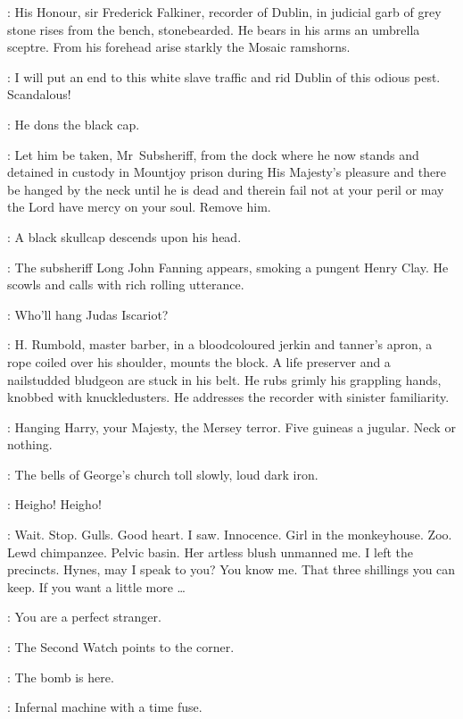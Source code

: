 :
His Honour,
sir Frederick Falkiner,
recorder of Dublin,
in judicial garb of grey stone rises from the bench,
stonebearded.
He bears in his arms an umbrella sceptre.
From his forehead arise starkly the Mosaic ramshorns.

\Recorder:
I will put an end to this white slave traffic
and rid Dublin of this odious pest.
Scandalous!

:
He dons the black cap.

\Recorder:
Let him be taken,
Mr~Subsheriff,
from the dock where he now stands
and detained in custody in Mountjoy prison during His Majesty's pleasure
and there be hanged by the neck until he is dead
and therein fail not at your peril or may the Lord have mercy on your soul.
Remove him.

:
A black skullcap descends upon his head.

:
The subsheriff Long John Fanning appears,
smoking a pungent Henry Clay.
He scowls and calls with rich rolling utterance.

\LongJohn:
Who'll hang Judas Iscariot?

:
H.
Rumbold,
master barber,
in a bloodcoloured jerkin and tanner's apron,
a rope coiled over his shoulder,
mounts the block.
A life preserver and a nailstudded bludgeon are stuck in his belt.
He rubs grimly his grappling hands,
knobbed with knuckledusters.
He addresses the recorder with sinister familiarity.

\Rumbold:
Hanging Harry,
your Majesty,
the Mersey terror.
Five guineas a jugular.
Neck or nothing.

:
The bells of George's church toll slowly,
loud dark iron.

\Bells:
Heigho!
Heigho!

\Bloom:
Wait.
Stop.
Gulls.
Good heart.
I saw.
Innocence.
Girl in the monkeyhouse.
Zoo.
Lewd chimpanzee.
Pelvic basin.
Her artless blush unmanned me.
I left the precincts.
Hynes,
may I speak to you?
You know me.
That three shillings you can keep.
If you want a little more \ldots

\Hynes[1]:
You are a perfect stranger.

:
The Second Watch points to the corner.

\SecondWatch:
The bomb is here.

\FirstWatch:
Infernal machine with a time fuse.

